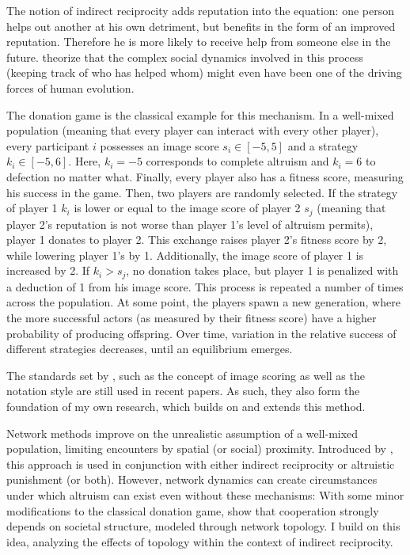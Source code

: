 \documentclass{JASSS}
\begin{document}
The notion of indirect reciprocity adds reputation into the equation: one person helps out another at his own detriment, but benefits in the form of an improved reputation. Therefore he is more likely to receive help from someone else in the future. \cite{Nowak1998} theorize that the complex social dynamics involved in this process (keeping track of who has helped whom) might even have been one of the driving forces of human evolution.

The donation game is the classical example for this mechanism. In a well-mixed population (meaning that every player can interact with every other player), every participant $i$ possesses an image score $s_i \in [-5,5]$ and a strategy $k_i \in [-5,6]$. Here, $k_i=-5$ corresponds to complete altruism and $k_i=6$ to defection no matter what. Finally, every player also has a fitness score, measuring his success in the game. Then, two players are randomly selected. If the strategy of player 1 $k_i$ is lower or equal to the image score of player 2 $s_j$ (meaning that player 2's reputation is not worse than player 1's level of altruism permits), player 1 donates to player 2. This exchange raises player 2's fitness score by 2, while lowering player 1's by 1. Additionally, the image score of player 1 is increased by 2. If $k_i>s_j$, no donation takes place, but player 1 is penalized with a deduction of 1 from his image score. This process is repeated a number of times across the population. At some point, the players spawn a new generation, where the more successful actors (as measured by their fitness score) have a higher probability of producing offspring. Over time, variation in the relative success of different strategies decreases, until an equilibrium emerges.

The standards set by \cite{Nowak1998}, such as the concept of image scoring as well as the notation style are still used in recent papers. As such, they also form the foundation of my own research, which builds on and extends this method.

Network methods improve on the unrealistic assumption of a well-mixed population, limiting encounters by spatial (or social) proximity. Introduced by \cite{Kearns2001}, this approach is used in conjunction with either indirect reciprocity or altruistic punishment (or both). However, network dynamics can create circumstances under which altruism can exist even without these mechanisms: With some minor modifications to the classical donation game, \citep{Santos2008} show that cooperation strongly depends on societal structure, modeled through network topology. I build on this idea, analyzing the effects of topology within the context of indirect reciprocity.
\end{document}
